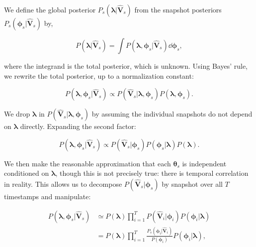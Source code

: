 \documentclass[linenumbers, twocolumn, tighten]{aastex701}
\begin{document}
We define the global posterior $P_s(\boldsymbol{\lambda} | \boldsymbol{\hat{V}}_{s})$ from the snapshot posteriors $P_s(\boldsymbol{\phi}_s | \boldsymbol{\hat{V}}_s)$ by,  

\begin{equation} \label{eq:global-post}
    P(\boldsymbol{\lambda} | \boldsymbol{\hat{V}}_{s}) = \int P(\boldsymbol{\lambda}, \boldsymbol{\phi}_s|\boldsymbol{\hat{V}}_s)\dd{\boldsymbol{\phi}_s},
\end{equation}

where the integrand is the total posterior, which is unknown. Using Bayes' rule, we rewrite the total posterior, up to a normalization constant:

\begin{equation}
    P(\boldsymbol{\lambda}, \boldsymbol{\phi}_s|\boldsymbol{\hat{V}}_s) \propto P(\boldsymbol{\hat{V}}_s | \boldsymbol{\lambda}, \boldsymbol{\phi}_s)P(\boldsymbol{\lambda}, \boldsymbol{\phi}_s).
\end{equation}

We drop $\boldsymbol{\lambda}$ in $P(\boldsymbol{\hat{V}}_s | \boldsymbol{\lambda}, \boldsymbol{\phi}_s)$ by assuming the individual snapshots do not depend on $\boldsymbol{\lambda}$ directly. Expanding the second factor:

\begin{equation}
    P(\boldsymbol{\lambda}, \boldsymbol{\phi}_s|\boldsymbol{\hat{V}}_s) \propto P(\boldsymbol{\hat{V}}_s | \boldsymbol{\phi}_s)P(\boldsymbol{\phi}_s|\boldsymbol{\lambda})P(\boldsymbol{\lambda}).
\end{equation}

We then make the reasonable approximation that each $\boldsymbol{\theta}_s$ is independent conditioned on $\boldsymbol{\lambda}$, though this is not precisely true: there is temporal correlation in reality. This allows us to decompose $P(\boldsymbol{\hat{V}}_s | \boldsymbol{\phi}_s)$ by snapshot over all $T$ timestamps and manipulate:

\begin{equation} \label{eq:total-post}
\begin{aligned}
    P(\boldsymbol{\lambda}, \boldsymbol{\phi}_s|\boldsymbol{\hat{V}}_s) &\simeq P(\boldsymbol{\lambda}) \prod_{i=1}^T P(\boldsymbol{\hat{V}}_i | \boldsymbol{\phi}_i) P(\boldsymbol{\phi}_i|\boldsymbol{\lambda}) \\
                    &= P(\boldsymbol{\lambda}) \prod_{i=1}^T \frac{P_s(\boldsymbol{\phi}_i | \boldsymbol{\hat{V}}_i)}{P(\boldsymbol{\phi}_i)}P(\boldsymbol{\phi}_i | \boldsymbol{\lambda}),
\end{aligned}
\end{equation}
\end{document}
